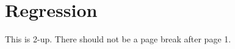 \documentclass[a4paper,\myClassOptions]{article}
\begin{document}
\tableofcontents
\listoffigures

\section{Regression}
This is 2-up. There should not be a page break after page 1.





\end{document}
